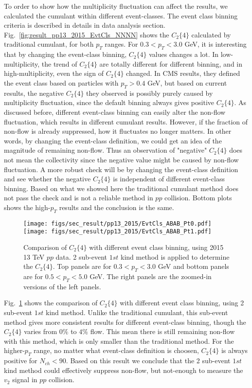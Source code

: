 To order to show how the multiplicity fluctuation can affect the results, we calculated the cumulant within different event-classes. The event class binning criteria is described in details in data analysis section. Fig.~\ref{fig:result_pp13_2015_EvtCls_NNNN} shows the $C_{2}\{4\}$ calculated by traditional cumulant, for both $p_{T}$ ranges. For $0.3<p_{T}<3.0$ GeV, it is interesting that by changing the event-class binning, $C_{2}\{4\}$ values changes a lot. In low-multiplicity, the trend of $C_{2}\{4\}$ are totally different for different binning, and in high-multiplicity, even the sign of $C_{2}\{4\}$ changed. In CMS results, they defined the event class based on particles with $p_{T}>0.4$ GeV, but based on current results, the negative $C_{2}\{4\}$ they observed is possibly purely caused by multiplicity fluctuation, since the default binning always gives positive $C_{2}\{4\}$. As discussed before, different event-class binning can easily alter the non-flow fluctuation, which results in different cumulant results. However, if the fraction of non-flow is already suppressed, how it fluctuates no longer matters. In other words, by changing the event-class definition, we could get an idea of the magnitude of remaining non-flow. Thus an observation of "negative" $C_{2}\{4\}$ does not mean the collectivity since the negative value might be caused by non-flow fluctuation. A more robust check will be by changing the event-class definition and see whether the negative $C_{2}\{4\}$ is independent of different event-class binning. Based on what we showed here the traditional cumulant method does not pass the check and is not a reliable method in $pp$ collision. Bottom plots shows the high-$p_{T}$ results and the conclusion is the same.

\begin{figure}[H]
\centering
\texttt{[image: figs/sec\_result/pp13\_2015/EvtCls\_ABAB\_Pt0.pdf]}
\texttt{[image: figs/sec\_result/pp13\_2015/EvtCls\_ABAB\_Pt1.pdf]}
\caption{Comparison of $C_{2}\{4\}$ with different event class binning, using 2015 13 TeV $pp$ data. 2 sub-event $1st$ kind method is applied to determine the $C_{2}\{4\}$. Top panels are for $0.3<p_{T}<3.0$ GeV and bottom panels are for $0.5<p_{T}<5.0$ GeV. The right panels are the zoomed-in versions of the left panels.}
\label{fig:result_pp13_2015_EvtCls_ABAB}
\end{figure}

Fig.~\ref{fig:result_pp13_2015_EvtCls_ABAB} shows the comparison of $C_{2}\{4\}$ with different event class binning, using 2 sub-event $1st$ kind method. Unlike the traditional cumulant, this sub-event method gives more consistent results for different event-class binning, though the $C_{2}\{4\}$ varies from $0\%$ to $4\%$ flow. This mean there is still remaining non-flow with this method, which is only smaller than the traditional method. For the higher-$p_{T}$ range, no matter what event-class definition is choosen, $C_{2}\{4\}$ is always positive for $N_{ch}<90$. Based on this result we conclude that the 2 sub-event $1st$ kind method could effectively suppress non-flow, but not-enough to measure the $v_{2}$ signal in $pp$ collision.

